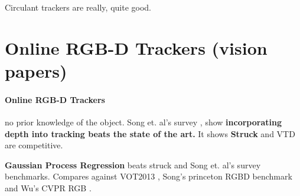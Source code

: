 Circulant trackers are really, quite good.



\section{Online RGB-D Trackers (vision papers)}
\label{sec:online}
\paragraph{Online RGB-D Trackers} no prior knowledge of the object.
Song et. al's survey \cite{song2013tracking}, show \textbf{incorporating depth into tracking beats the state of the art.} It shows \textbf{Struck} \cite{hare2011struck} and VTD are competitive.

\textbf{Gaussian Process Regression} \cite{gao2014transfer} beats struck and Song et. al's survey benchmarks. Compares against VOT2013 \cite{kristan2013visual}, Song's princeton RGBD benchmark \cite{song2013tracking} and Wu's CVPR RGB \cite{wu2013online}.

